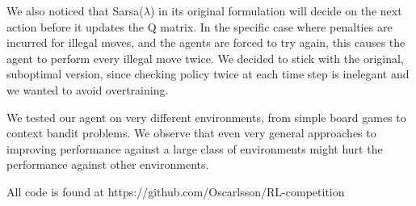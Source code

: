 We also noticed that Sarsa($\lambda$) in its original formulation will decide on the next action before it updates the Q matrix. In the specific case where penalties are incurred for illegal moves, and the agents are forced to try again, this causes the agent to perform every illegal move twice. We decided to stick with the original, suboptimal version, since checking policy twice at each time step is inelegant and we wanted to avoid overtraining.

We tested our agent on very different environments, from simple board games to context bandit problems. We observe that even very general approaches to improving performance against a large class of environments might hurt the performance against other environments.

All code is found at https://github.com/Oscarlsson/RL-competition
